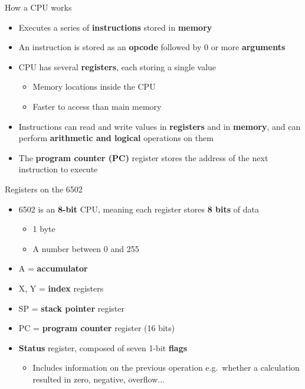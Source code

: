 \begin{frame}{How a CPU works}
	\begin{itemize}
		\pause\item Executes a series of \textbf{instructions} stored in \textbf{memory}
		\pause\item An instruction is stored as an \textbf{opcode} followed by 0 or more \textbf{arguments}
		\pause\item CPU has several \textbf{registers}, each storing a single value
			\begin{itemize}
				\pause\item Memory locations inside the CPU
				\pause\item Faster to access than main memory
			\end{itemize}
		\pause\item Instructions can read and write values in \textbf{registers} and in \textbf{memory},
			and can perform \textbf{arithmetic and logical} operations on them
		\pause\item The \textbf{program counter (PC)} register stores the address of the next instruction to execute
	\end{itemize}
\end{frame}

\begin{frame}{Registers on the 6502}
	\begin{itemize}
		\pause\item 6502 is an \textbf{8-bit} CPU, meaning each register stores \textbf{8 bits} of data
			\begin{itemize}
				\pause\item 1 byte
				\pause\item A number between 0 and 255
			\end{itemize}
		\pause\item A = \textbf{accumulator}
		\pause\item X, Y = \textbf{index} registers
		\pause\item SP = \textbf{stack pointer} register
		\pause\item PC = \textbf{program counter} register (16 bits)
		\pause\item \textbf{Status} register, composed of seven 1-bit \textbf{flags}
		\begin{itemize}
			\pause\item Includes information on the previous operation
				e.g.\ whether a calculation resulted in zero, negative, overflow...
		\end{itemize}
	\end{itemize}
\end{frame}

